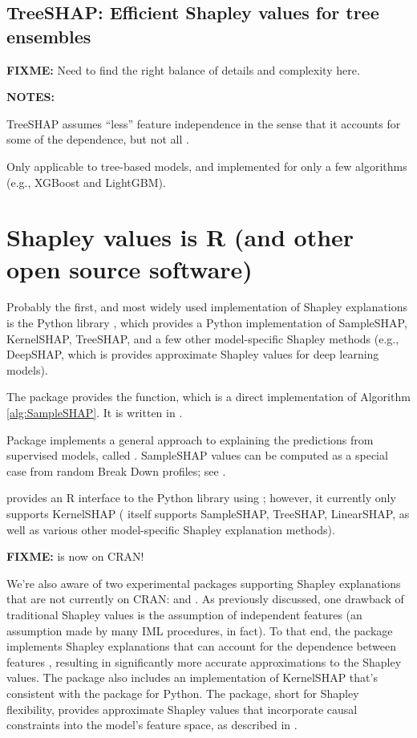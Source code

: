\subsection{TreeSHAP: Efficient Shapley values for tree ensembles}

\textbf{FIXME:} Need to find the right balance of details and complexity
here.

\textbf{NOTES:}

TreeSHAP assumes ``less'' feature independence in the sense that it
accounts for some of the dependence, but not all
\citep{aas-2020-explaining}.

Only applicable to tree-based models, and implemented for only a few
algorithms (e.g., XGBoost and LightGBM).

\section{Shapley values is R (and other open source software)}

Probably the first, and most widely used implementation of Shapley
explanations is the Python  library
\citep{lundberg-2017-KernelSHAP}, which provides a Python implementation
of SampleSHAP, KernelSHAP, TreeSHAP, and a few other model-specific
Shapley methods (e.g., DeepSHAP, which is provides approximate Shapley
values for deep learning models).

The  package \citep{R-iml} provides the 
function, which is a direct implementation of Algorithm
\ref{alg:SampleSHAP}. It is written in  \citep{R-R6}.

Package  implements a general approach to explaining
the predictions from supervised models, called 
\citep{gosiewska-2019-iBreakDown}. SampleSHAP values can be computed as
a special case from random Break Down profiles; see
.

 provides an R interface to the Python 
library using  \citep{R-reticulate}; however, it
currently only supports KernelSHAP ( itself supports
SampleSHAP, TreeSHAP, LinearSHAP, as well as various other
model-specific Shapley explanation methods).

\textbf{FIXME:}  is now on CRAN!

We're also aware of two experimental packages supporting Shapley
explanations that are not currently on CRAN: 
\citep{R-sellereite} and  \citep{R-shapFlex}. As
previously discussed, one drawback of traditional Shapley values is the
assumption of independent features (an assumption made by many IML
procedures, in fact). To that end, the  package implements
Shapley explanations that can account for the dependence between
features \citep{aas-2019-explaining}, resulting in significantly more
accurate approximations to the Shapley values. The package also includes
an implementation of KernelSHAP that's consistent with the 
package for Python. The  package, short for Shapley
flexibility, provides approximate Shapley values that incorporate causal
constraints into the model's feature space, as described in
\citet{frye-2019-asymmetric}.

